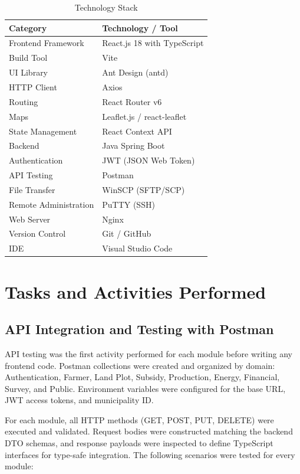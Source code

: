 \documentclass[12pt,a4paper]{report}
\begin{document}
\begin{table}[H]
\centering
\caption{Technology Stack}
\renewcommand{\arraystretch}{1.4}
\begin{tabular}{|p{4.2cm}|p{8.8cm}|}
\hline
\textbf{Category} & \textbf{Technology / Tool} \\
\hline
Frontend Framework & React.js 18 with TypeScript \\
\hline
Build Tool & Vite \\
\hline
UI Library & Ant Design (antd) \\
\hline
HTTP Client & Axios \\
\hline
Routing & React Router v6 \\
\hline
Maps & Leaflet.js / react-leaflet \\
\hline
State Management & React Context API \\
\hline
Backend & Java Spring Boot \\
\hline
Authentication & JWT (JSON Web Token) \\
\hline
API Testing & Postman \\
\hline
File Transfer & WinSCP (SFTP/SCP) \\
\hline
Remote Administration & PuTTY (SSH) \\
\hline
Web Server & Nginx \\
\hline
Version Control & Git / GitHub \\
\hline
IDE & Visual Studio Code \\
\hline
\end{tabular}
\end{table}

\section{Tasks and Activities Performed}

\subsection{API Integration and Testing with Postman}

API testing was the first activity performed for each module before writing any frontend
code. Postman collections were created and organized by domain: Authentication, Farmer,
Land Plot, Subsidy, Production, Energy, Financial, Survey, and Public. Environment
variables were configured for the base URL, JWT access tokens, and municipality ID.

For each module, all HTTP methods (GET, POST, PUT, DELETE) were executed and
validated. Request bodies were constructed matching the backend DTO schemas, and
response payloads were inspected to define TypeScript interfaces for type-safe integration.
The following scenarios were tested for every module:
\end{document}
